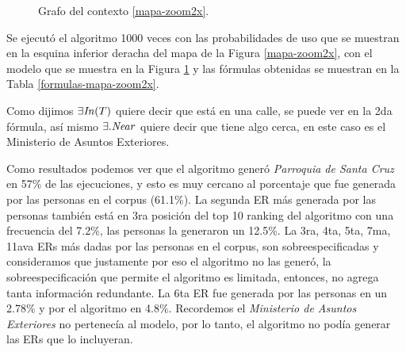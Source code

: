 \begin{figure}[H]
\caption{Grafo del contexto \ref{mapa-zoom2x}.}
\label{modelo-mapa-zoom2x}
\end{figure}


Se ejecut\'o el algoritmo 1000 veces con las probabilidades de uso que se muestran en la esquina inferior deracha del mapa de la Figura \ref{mapa-zoom2x}, con el modelo que se muestra en la Figura \ref{modelo-mapa-zoom2x} y las f\'ormulas obtenidas se muestran en la Tabla \ref{formulas-mapa-zoom2x}.

Como dijimos $\exists \mathit{In}(T)$ quiere decir que est\'a en una calle, se puede ver en la 2da f\'ormula, as\'i mismo $\exists.\mathit{Near}$ quiere decir que tiene algo cerca, en este caso es el Ministerio de Asuntos Exteriores.

Como resultados podemos ver que el algoritmo gener\'o {\it Parroquia de Santa Cruz} en 57\% de las ejecuciones, y esto es muy cercano al porcentaje que fue generada por las personas en el corpus (61.1\%). La segunda ER m\'as generada por las personas tambi\'en est\'a en 3ra posici\'on del top 10 ranking del algoritmo con una frecuencia del 7.2\%, las personas la generaron un 12.5\%. La 3ra, 4ta, 5ta, 7ma, 11ava ERs m\'as dadas por las personas en el corpus, son sobreespecificadas y consideramos que justamente por eso el algoritmo no las gener\'o, la sobreespecificaci\'on que permite el algoritmo es limitada, entonces, no agrega tanta informaci\'on redundante. La 6ta ER fue generada por las personas en un 2.78\% y por el algoritmo en 4.8\%. Recordemos el {\it Ministerio de Asuntos Exteriores} no pertenec\'ia al modelo, por lo tanto, el algoritmo no pod\'ia generar las ERs que lo incluyeran.%


